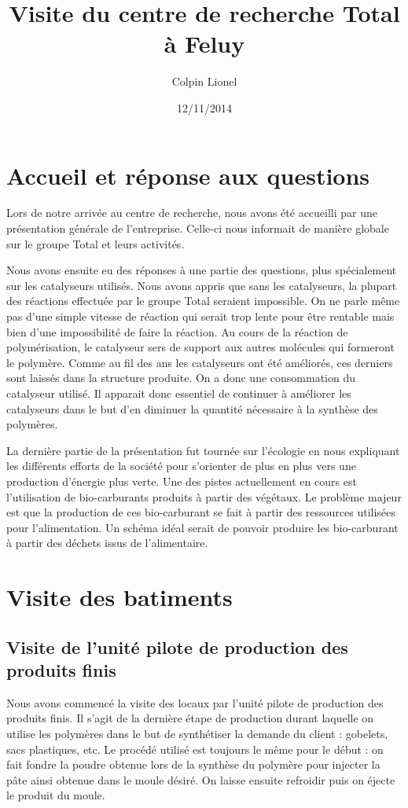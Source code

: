 \documentclass[12pt]{amsart}
\title{Visite du centre de recherche Total à Feluy}
\author{Colpin Lionel}
\date{12/11/2014}
\begin{document}
\maketitle

\section{Accueil et réponse aux questions}
Lors de notre arrivée au centre de recherche, nous avons été accueilli par une présentation générale de l'entreprise. Celle-ci nous informait de manière globale sur le groupe Total et leurs activités. 

Nous avons ensuite eu des réponses à une partie des questions, plus spécialement sur les catalyseurs utilisés. Nous avons appris que sans les catalyseurs, la plupart des réactions effectuée par le groupe Total seraient impossible. On ne parle même pas d'une simple vitesse de réaction qui serait trop lente pour être rentable mais bien d'une impossibilité de faire la réaction. Au cours de la réaction de polymérisation, le catalyseur sers de support aux autres molécules qui formeront le polymère. Comme au fil des ans les catalyseurs ont été améliorés, ces derniers sont laissés dans la structure produite. On a donc une consommation du catalyseur utilisé. Il apparait donc essentiel de continuer à améliorer les catalyseurs dans le but d'en diminuer la quantité nécessaire à la synthèse des polymères.

La dernière partie de la présentation fut tournée sur l'écologie en nous expliquant les différents efforts de la société pour s'orienter de plus en plus vers une production d'énergie plus verte. Une des pistes actuellement en cours est l'utilisation de bio-carburants produits à partir des végétaux. Le problème majeur est que la production de ces bio-carburant se fait à partir des ressources utilisées pour l'alimentation. Un schéma idéal serait de pouvoir produire les bio-carburant à partir des déchets issus de l'alimentaire.

\section{Visite des batiments}

\subsection{Visite de l'unité pilote de production des produits finis}

Nous avons commencé la visite des locaux par l'unité pilote de production des produits finis. Il s'agit de la dernière étape de production durant laquelle on utilise les polymères dans le but de synthétiser la demande du client : gobelets, sacs plastiques, etc. Le procédé utilisé est toujours le même pour le début : on fait fondre la poudre obtenue lors de la synthèse du polymère pour injecter la pâte ainsi obtenue dans le moule désiré. On laisse ensuite refroidir puis on éjecte le produit du moule.
\end{document}
